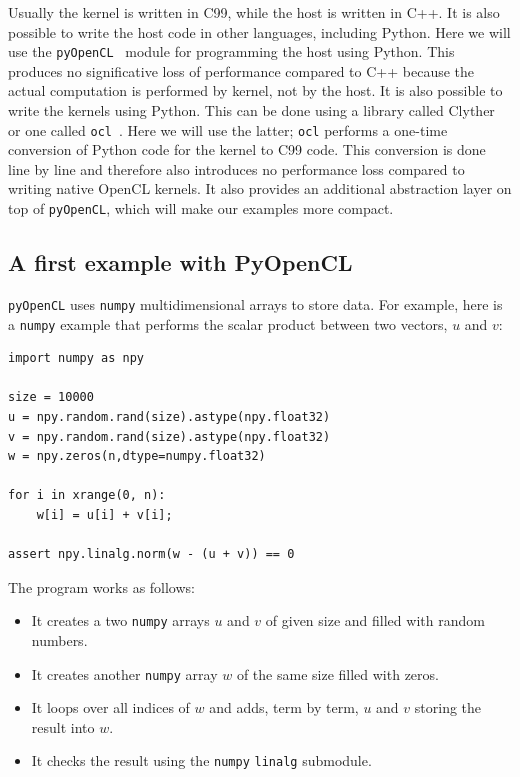 \documentclass[justified,sixbynine]{tufte-book}
\def\ft{\small\tt}
\theoremstyle{plain}%
\theoremstyle{definition}
\theoremstyle{remark}
\begin{document}
\begin{fullwidth}
Usually the kernel is written in C99, while the host is written in C++. It is also possible to write the host code in other languages, including Python. Here we will use the {\ft pyOpenCL}~\cite{pyopencl} module for programming the host using Python. This produces no significative loss of performance compared to C++ because the actual computation is performed by kernel, not by the host. It is also possible to write the kernels using Python. This can be done using a library called Clyther~\cite{clyther} or one called {\ft ocl}~\cite{ocl}. Here we will use the latter; {\ft ocl} performs a one-time conversion of Python code for the kernel to C99 code. This conversion is done line by line and therefore also introduces no performance loss compared to writing native OpenCL kernels. It also provides an additional abstraction layer on top of {\ft pyOpenCL}, which will make our examples more compact.

\subsection{A first example with PyOpenCL}

{\ft pyOpenCL} uses {\ft numpy} multidimensional arrays to store data. For example, here is a {\ft numpy} example that performs the scalar product between two vectors, $u$ and $v$:

\begin{lstlisting}
import numpy as npy

size = 10000
u = npy.random.rand(size).astype(npy.float32)
v = npy.random.rand(size).astype(npy.float32)
w = npy.zeros(n,dtype=numpy.float32)

for i in xrange(0, n):
    w[i] = u[i] + v[i];

assert npy.linalg.norm(w - (u + v)) == 0
\end{lstlisting}

The program works as follows:
\begin{itemize}
\item It creates a two {\ft numpy} arrays $u$ and $v$ of given size and filled with random numbers.
\item It creates another {\ft numpy} array $w$ of the same size filled with zeros.
\item It loops over all indices of $w$ and adds, term by term, $u$ and $v$ storing the result into $w$.
\item It checks the result using the {\ft numpy} {\ft linalg} submodule.
\end{itemize}


\end{fullwidth}
\end{document}
